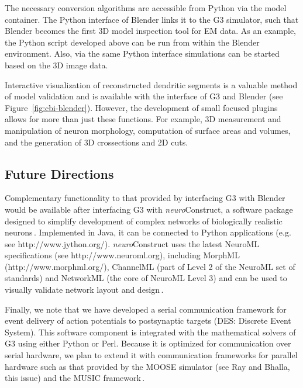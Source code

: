 \documentclass[12pt]{article}
\begin{document}
The necessary conversion algorithms are accessible from Python via the
model container.  The Python interface of Blender links it to the G3
simulator, such that Blender becomes the first 3D model inspection
tool for EM data.  As an example, the Python script developed above
can be run from within the Blender environment.  Also, via the same
Python interface simulations can be started based on the 3D image
data.

Interactive visualization of reconstructed dendritic segments is a
valuable method of model validation and is available with the
interface of G3 and Blender (see Figure~\ref{fig:cbi-blender}).
However, the development of small focused plugins allows for more than
just these functions. For example, 3D measurement and manipulation of
neuron morphology, computation of surface areas and volumes, and the
generation of 3D crossections and 2D cuts.

\subsection{Future Directions}
Complementary functionality to that provided by interfacing G3 with
Blender would be available after interfacing G3 with {\it
  neuro}Construct, a software package designed to simplify development
of complex networks of biologically realistic
neurons\,\cite{gleeson05:_build_networ_model}.  Implemented in Java,
it can be connected to Python applications (e.g. see
http://www.jython.org/).  {\it neuro}Construct uses the latest NeuroML
specifications (see http://www.neuroml.org), including MorphML
(http://www.morphml.org/), ChannelML (part of Level 2 of the NeuroML
set of standards) and NetworkML (the core of NeuroML Level 3) and can
be used to visually validate network layout and
design\,\cite{crook07:_morph}.

Finally, we note that we have developed a serial communication
framework for event delivery of action potentials to postsynaptic
targets (DES: Discrete Event System).  This software component is
integrated with the mathematical solvers of G3 using either Python or
Perl.  Because it is optimized for communication over serial hardware,
we plan to extend it with communication frameworks for parallel
hardware such as that provided by the MOOSE simulator (see Ray and
Bhalla, this issue) and the MUSIC
framework\,\cite{ekeberg08:_music_multis_coord}.
\end{document}
